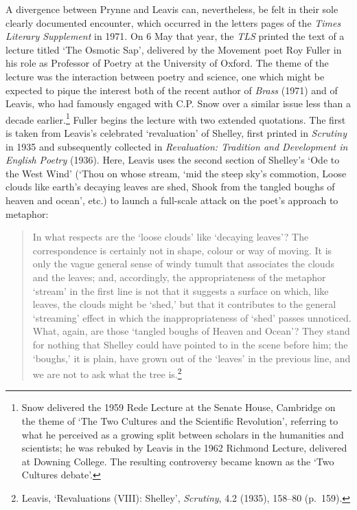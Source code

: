 \documentclass[]{article}
\begin{document}
A divergence between Prynne and Leavis can, nevertheless, be felt in
their sole clearly documented encounter, which occurred in the letters
pages of the \emph{Times Literary Supplement} in 1971. On 6 May that
year, the \emph{TLS} printed the text of a lecture titled `The Osmotic
Sap', delivered by the Movement poet Roy Fuller in his role as Professor
of Poetry at the University of Oxford. The theme of the lecture was the
interaction between poetry and science, one which might be expected to
pique the interest both of the recent author of \emph{Brass} (1971) and
of Leavis, who had famously engaged with C.P. Snow over a similar issue
less than a decade earlier.\footnote{Snow delivered the 1959 Rede
  Lecture at the Senate House, Cambridge on the theme of `The Two
  Cultures and the Scientific Revolution', referring to what he
  perceived as a growing split between scholars in the humanities and
  scientists; he was rebuked by Leavis in the 1962 Richmond Lecture,
  delivered at Downing College. The resulting controversy became known
  as the `Two Cultures debate'.} Fuller begins the lecture with two
extended quotations. The first is taken from Leavis's celebrated
`revaluation' of Shelley, first printed in \emph{Scrutiny} in 1935 and
subsequently collected in \emph{Revaluation: Tradition and Development
in English Poetry} (1936). Here, Leavis uses the second section of
Shelley's `Ode to the West Wind' (`Thou on whose stream, `mid the steep
sky's commotion, \textbar{} Loose clouds like earth's decaying leaves
are shed, \textbar{} Shook from the tangled boughs of heaven and ocean',
etc.) to launch a full-scale attack on the poet's approach to metaphor:

\begin{quote}
In what respects are the `loose clouds' like `decaying leaves'? The
correspondence is certainly not in shape, colour or way of moving. It is
only the vague general sense of windy tumult that associates the clouds
and the leaves; and, accordingly, the appropriateness of the metaphor
`stream' in the first line is not that it suggests a surface on which,
like leaves, the clouds might be `shed,' but that it contributes to the
general `streaming' effect in which the inappropriateness of `shed'
passes unnoticed. What, again, are those `tangled boughs of Heaven and
Ocean'? They stand for nothing that Shelley could have pointed to in the
scene before him; the `boughs,' it is plain, have grown out of the
`leaves' in the previous line, and we are not to ask what the tree
is.\footnote{Leavis, `Revaluations (VIII): Shelley', \emph{Scrutiny},
  4.2 (1935), 158--80 (p.~159).}
\end{quote}
\end{document}

